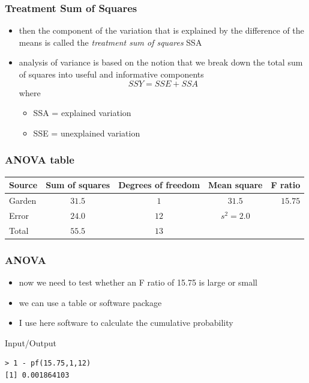 \begin{frame}\frametitle{Treatment Sum of Squares}
\begin{itemize}
  \item then the component of the variation that is explained by the difference of the means is called the \emph{treatment sum of squares} SSA
  \item analysis of variance is based  on the notion that we break down the total sum of squares into useful and informative components
$$SSY=SSE+SSA$$ where
    \begin{itemize}
      \item SSA = explained variation
      \item SSE = unexplained variation
    \end{itemize}

  \end{itemize}
\end{frame}

\begin{frame}\frametitle{ANOVA table}
\begin{center}
\small
\begin{tabular}{@{} >{\ttfamily}l cccr}
\hline
Source & Sum of squares & Degrees of freedom & Mean square & F ratio \\
\hline
Garden &  $31.5$ & $1$ &  $31.5$ &  $15.75$\\
Error &  $24.0$ & $12$ &  $s^2=2.0$ &  \\
Total & $55.5$ & $13$ & & \\   \hline
\end{tabular}
\end{center}
\end{frame}


\begin{frame}[fragile]\frametitle{ANOVA}
  \begin{itemize}
  \item now we need to test whether an F ratio of 15.75 is large or small
  \item we can use a table or software package
  \item I use here software to calculate the cumulative probability
  \end{itemize}
\begin{exampleblock}{Input/Output}
\begin{verbatim}
> 1 - pf(15.75,1,12)
[1] 0.001864103
\end{verbatim}
\end{exampleblock}
\end{frame}

